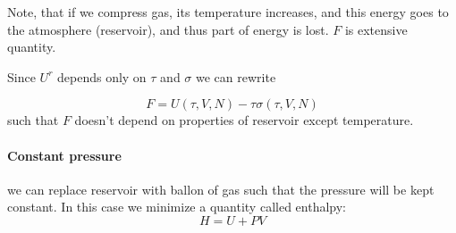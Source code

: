 Note, that if we compress gas, its temperature increases, and this energy goes to the atmosphere (reservoir), and thus part of energy is lost. $F$ is extensive quantity.

Since $U^r$ depends only on $\tau$ and $\sigma$ we can rewrite

$$F = U(\tau, V, N) - \tau \sigma(\tau, V, N) $$
such that $F$ doesn't depend on properties of reservoir except temperature.
\paragraph{Constant pressure}
we can replace reservoir with ballon of gas such that the pressure will be kept constant. In this case we minimize a quantity called enthalpy:
$$H = U+PV$$